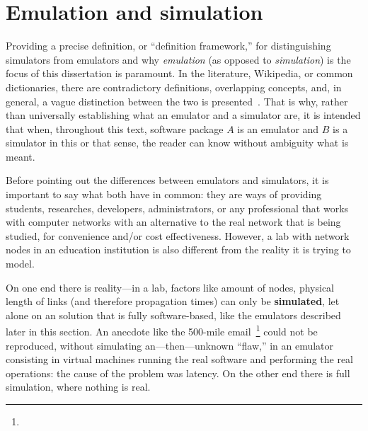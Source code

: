 \section{Emulation and simulation}
\label{sec:leavingemulationandsimulation}

Providing a precise definition, or ``definition framework,'' for distinguishing simulators from emulators and why \emph{emulation} (as opposed to \emph{simulation}) is the focus of this dissertation is paramount.
In the literature, Wikipedia, or common dictionaries, there are contradictory definitions, overlapping concepts, and, in general, a vague distinction between the two is presented~\cite{netsimoremu}. %
That is why, rather than universally establishing what an emulator and a simulator are, it is intended that when, throughout this text, software package $A$ is an emulator and $B$ is a simulator in this or that sense, the reader can know without ambiguity what is meant.


Before pointing out the differences between emulators and simulators, it is important to say what both have in common: they are ways of providing students, researches, developers, administrators, or any professional that works with computer networks with an alternative to the real network that is being studied, for convenience and/or cost effectiveness.
However, a lab with network nodes in an education institution is also different from the reality it is trying to model.

On one end there is reality---in a lab, factors like amount of nodes, physical length of links (and therefore propagation times) can only be \textbf{simulated}, let alone on an solution that is fully software-based, like the emulators described later in this section.
An anecdote like the 500-mile email~\footnote{} could not be reproduced, without simulating an---then---unknown ``flaw,'' in an emulator consisting in virtual machines running the real software and performing the real operations: the cause of the problem was latency.
On the other end there is full simulation, where nothing is real.

